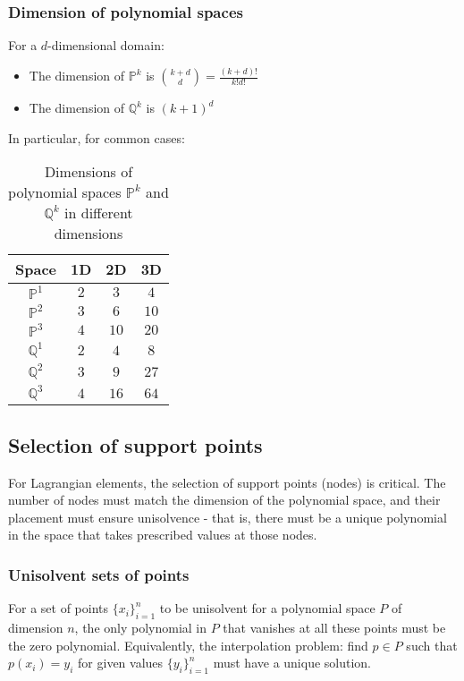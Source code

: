 \subsubsection{Dimension of polynomial spaces}

For a $d$-dimensional domain:

\begin{itemize}
\item The dimension of $\mathbb{P}^k$ is $\binom{k+d}{d} = \frac{(k+d)!}{k!d!}$
\item The dimension of $\mathbb{Q}^k$ is $(k+1)^d$
\end{itemize}

In particular, for common cases:

\begin{table}[h]
\centering
\begin{tabular}{|c|c|c|c|}
\hline
\textbf{Space} & \textbf{1D} & \textbf{2D} & \textbf{3D} \\
\hline
$\mathbb{P}^1$ & $2$ & $3$ & $4$ \\
$\mathbb{P}^2$ & $3$ & $6$ & $10$ \\
$\mathbb{P}^3$ & $4$ & $10$ & $20$ \\
\hline
$\mathbb{Q}^1$ & $2$ & $4$ & $8$ \\
$\mathbb{Q}^2$ & $3$ & $9$ & $27$ \\
$\mathbb{Q}^3$ & $4$ & $16$ & $64$ \\
\hline
\end{tabular}
\caption{Dimensions of polynomial spaces $\mathbb{P}^k$ and $\mathbb{Q}^k$ in different dimensions}
\end{table}

\subsection{Selection of support points}

For Lagrangian elements, the selection of support points (nodes) is critical. The number of nodes must match the dimension of the polynomial space, and their placement must ensure unisolvence - that is, there must be a unique polynomial in the space that takes prescribed values at those nodes.

\subsubsection{Unisolvent sets of points}

For a set of points $\{x_i\}_{i=1}^n$ to be unisolvent for a polynomial space $P$ of dimension $n$, the only polynomial in $P$ that vanishes at all these points must be the zero polynomial. Equivalently, the interpolation problem: find $p \in P$ such that $p(x_i) = y_i$ for given values $\{y_i\}_{i=1}^n$ must have a unique solution.

